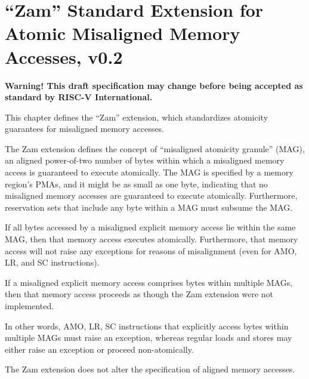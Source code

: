 \chapter{``Zam'' Standard Extension for Atomic Misaligned Memory Accesses, v0.2}
\label{sec:zam}

{\bf Warning! This draft specification may change before being
accepted as standard by RISC-V International.}

This chapter defines the ``Zam'' extension, which standardizes atomicity
guarantees for misaligned memory accesses.

The Zam extension defines the concept of ``misaligned atomicity granule''
(MAG), an aligned power-of-two number of bytes within which a misaligned
memory access is guaranteed to execute atomically.
The MAG is specified by a memory region's PMAs, and it might be as small as
one byte, indicating that no misaligned memory accesses are guaranteed to
execute atomically.
Furthermore, reservation sets that include any byte within a MAG must
subsume the MAG.

If all bytes accessed by a misaligned explicit memory access lie within the
same MAG, then that memory access executes atomically.
Furthermore, that memory access will not raise any exceptions for reasons
of misalignment (even for AMO, LR, and SC instructions).

If a misaligned explicit memory access comprises bytes within multiple MAGs,
then that memory access proceeds as though the Zam extension were not
implemented.

\begin{commentary}
In other words, AMO, LR, SC instructions that explicitly access bytes within
multiple MAGs must raise an exception, whereas regular loads and
stores may either raise an exception or proceed non-atomically.
\end{commentary}

\begin{commentary}
The Zam extension does not alter the specification of aligned memory accesses.
\end{commentary}
